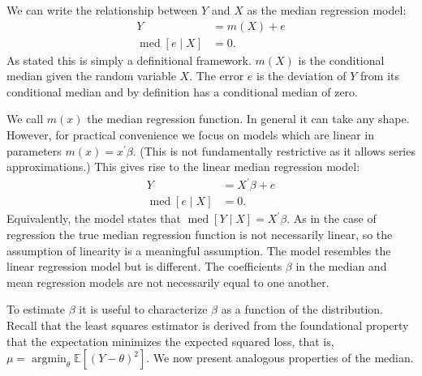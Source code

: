 \documentclass[10pt]{article}
\begin{document}
We can write the relationship between $Y$ and $X$ as the median regression model:
$$
\begin{aligned}
Y &=m(X)+e \\
\operatorname{med}[e \mid X] &=0 .
\end{aligned}
$$
As stated this is simply a definitional framework. $m(X)$ is the conditional median given the random variable $X$. The error $e$ is the deviation of $Y$ from its conditional median and by definition has a conditional median of zero.

We call $m(x)$ the median regression function. In general it can take any shape. However, for practical convenience we focus on models which are linear in parameters $m(x)=x^{\prime} \beta$. (This is not fundamentally restrictive as it allows series approximations.) This gives rise to the linear median regression model:
$$
\begin{aligned}
Y &=X^{\prime} \beta+e \\
\operatorname{med}[e \mid X] &=0 .
\end{aligned}
$$
Equivalently, the model states that $\operatorname{med}[Y \mid X]=X^{\prime} \beta$. As in the case of regression the true median regression function is not necessarily linear, so the assumption of linearity is a meaningful assumption. The model resembles the linear regression model but is different. The coefficients $\beta$ in the median and mean regression models are not necessarily equal to one another.

To estimate $\beta$ it is useful to characterize $\beta$ as a function of the distribution. Recall that the least squares estimator is derived from the foundational property that the expectation minimizes the expected squared loss, that is, $\mu=\operatorname{argmin}_{\theta} \mathbb{E}\left[(Y-\theta)^{2}\right]$. We now present analogous properties of the median.
\end{document}
